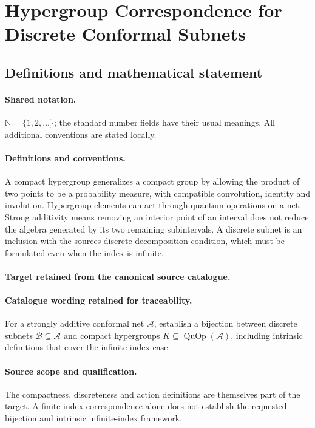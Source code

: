 \documentclass[11pt]{article}
\begin{document}
\section{Hypergroup Correspondence for Discrete Conformal Subnets}\label{statement}

\subsection{Definitions and mathematical statement}

\paragraph{Shared notation.}$\mathbb N=\{1,2,\ldots\}$; the standard number fields have their usual meanings. All additional conventions are stated locally.


\paragraph{Definitions and conventions.}
A compact hypergroup generalizes a compact group by allowing the product of two points to be a probability measure, with compatible convolution, identity and involution. Hypergroup elements can act through quantum operations on a net. Strong additivity means removing an interior point of an interval does not reduce the algebra generated by its two remaining subintervals. A discrete subnet is an inclusion with the source\textquotesingle s discrete decomposition condition, which must be formulated even when the index is infinite.

\paragraph{Target retained from the canonical source catalogue.}
\paragraph{Catalogue wording retained for traceability.}
For a strongly additive conformal net $\mathcal A$, establish a bijection between discrete subnets $\mathcal B\subseteq\mathcal A$ and compact hypergroups $K\subseteq\operatorname{QuOp}(\mathcal A)$, including intrinsic definitions that cover the infinite-index case.

\paragraph{Source scope and qualification.}
The compactness, discreteness and action definitions are themselves part of the target. A finite-index correspondence alone does not establish the requested bijection and intrinsic infinite-index framework.
\end{document}
